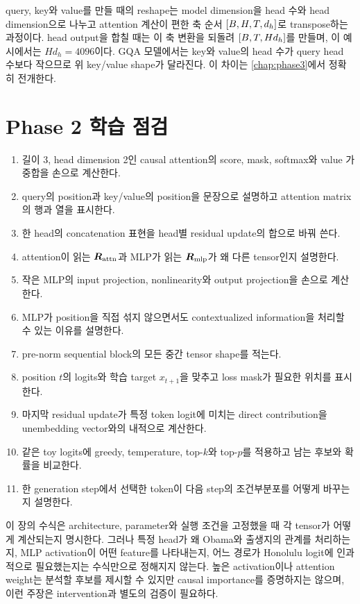 query, key와 value를 만들 때의 reshape는 model dimension을 head 수와 head dimension으로 나누고 attention 계산이 편한 축 순서 $\left[B,H,T,d_h\right]$로 transpose하는 과정이다.
head output을 합칠 때는 이 축 변환을 되돌려 $\left[B,T,Hd_h\right]$를 만들며, 이 예시에서는 $Hd_h=4096$이다.
GQA 모델에서는 key와 value의 head 수가 query head 수보다 작으므로 위 key/value shape가 달라진다.
이 차이는 \cref{chap:phase3}에서 정확히 전개한다.

\section{Phase 2 학습 점검}

\begin{studybox}
\begin{enumerate}
  \item 길이 3, head dimension 2인 causal attention의 score, mask, softmax와 value 가중합을 손으로 계산한다.
  \item query의 position과 key/value의 position을 문장으로 설명하고 attention matrix의 행과 열을 표시한다.
  \item 한 head의 concatenation 표현을 head별 residual update의 합으로 바꿔 쓴다.
  \item attention이 읽는 $\bm{R}_{\mathrm{attn}}$과 MLP가 읽는 $\bm{R}_{\mathrm{mlp}}$가 왜 다른 tensor인지 설명한다.
  \item 작은 MLP의 input projection, nonlinearity와 output projection을 손으로 계산한다.
  \item MLP가 position을 직접 섞지 않으면서도 contextualized information을 처리할 수 있는 이유를 설명한다.
  \item pre-norm sequential block의 모든 중간 tensor shape를 적는다.
  \item position $t$의 logits와 학습 target $x_{t+1}$을 맞추고 loss mask가 필요한 위치를 표시한다.
  \item 마지막 residual update가 특정 token logit에 미치는 direct contribution을 unembedding vector와의 내적으로 계산한다.
  \item 같은 toy logits에 greedy, temperature, top-$k$와 top-$p$를 적용하고 남는 후보와 확률을 비교한다.
  \item 한 generation step에서 선택한 token이 다음 step의 조건부분포를 어떻게 바꾸는지 설명한다.
\end{enumerate}
\end{studybox}

\begin{limitbox}
이 장의 수식은 architecture, parameter와 실행 조건을 고정했을 때 각 tensor가 어떻게 계산되는지 명시한다.
그러나 특정 head가 왜 Obama와 출생지의 관계를 처리하는지, MLP activation이 어떤 feature를 나타내는지, 어느 경로가 Honolulu logit에 인과적으로 필요했는지는 수식만으로 정해지지 않는다.
높은 activation이나 attention weight는 분석할 후보를 제시할 수 있지만 causal importance를 증명하지는 않으며, 이런 주장은 intervention과 별도의 검증이 필요하다.
\end{limitbox}
